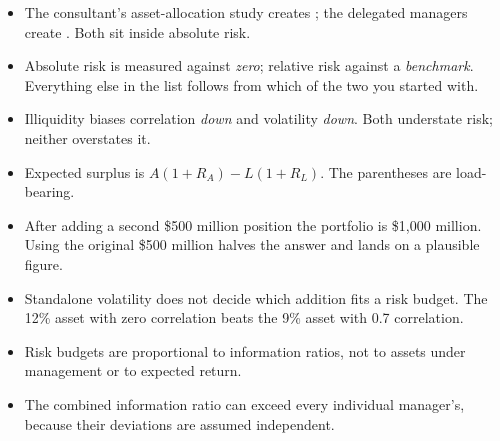 \begin{imtrapbox}[breakable=false,title={Consolidated trap summary --- IM-6}]
\begin{itemize}
\item {} The consultant's asset-allocation study creates
; the delegated managers create . Both sit inside absolute risk.
\item {} Absolute risk is measured against \emph{zero};
relative risk against a \emph{benchmark}. Everything else in the list follows
from which of the two you started with.
\item {} Illiquidity biases correlation \emph{down} and
volatility \emph{down}. Both understate risk; neither overstates it.
\item {} Expected surplus is $A(1+R_A) - L(1+R_L)$. The
parentheses are load-bearing.
\item {} After adding a second \$500 million
position the portfolio is \$1,000 million. Using the original \$500 million halves
the answer and lands on a plausible figure.
\item {} Standalone volatility does not decide which addition
fits a risk budget. The 12\% asset with zero correlation beats the 9\% asset with
0.7 correlation.
\item {} Risk budgets are proportional to information
ratios, not to assets under management or to expected return.
\item {} The combined information ratio can exceed every
individual manager's, because their deviations are assumed independent.
\end{itemize}
\end{imtrapbox}

